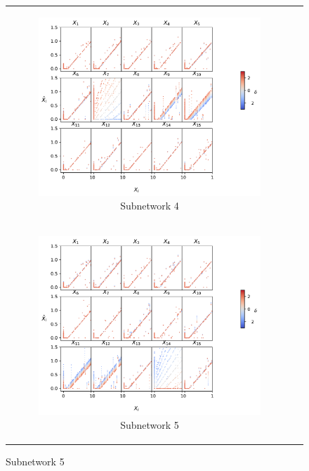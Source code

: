 \documentclass{article}
\theoremstyle{plain}
\theoremstyle{definition}
\theoremstyle{remark}
\begin{document}
\begin{figure}[ht]
\begin{minipage}{\textwidth}
\begin{tabular}{cc}
            \begin{subfigure}{0.3\textwidth}
                \centering
                \includegraphics[width=\linewidth]{../figures/s4_tms_intervention_network4.pdf}
                \caption{Subnetwork 4}
            \end{subfigure} \\
            \hspace{\fill} %
            \begin{subfigure}{0.3\textwidth}
                \centering
                \includegraphics[width=\linewidth]{../figures/s4_tms_intervention_network5.pdf}
                \caption{Subnetwork 5}
            \end{subfigure} &
            \hspace{\fill} %
        \end{tabular}
    \end{minipage}

\end{figure}
\end{document}
